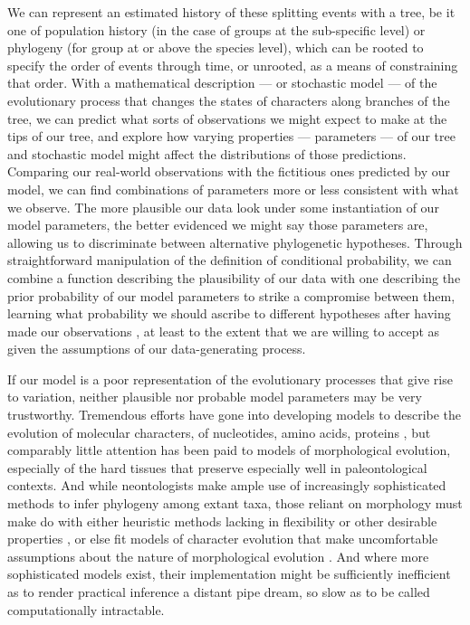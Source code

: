 We can represent an estimated history of these splitting events with a tree, be it one of population history (in the case of groups at the sub-specific level) or phylogeny (for group at or above the species level), which can be rooted to specify the order of events through time, or unrooted, as a means of constraining that order. With a mathematical description --- or stochastic model --- of the evolutionary process that changes the states of characters along branches of the tree, we can predict what sorts of observations we might expect to make at the tips of our tree, and explore how varying properties --- parameters --- of our tree and stochastic model might affect the distributions of those predictions. Comparing our real-world observations with the fictitious ones predicted by our model, we can find combinations of parameters more or less consistent with what we observe. The more plausible our data look under some instantiation of our model parameters, the better evidenced we might say those parameters are, allowing us to discriminate between alternative phylogenetic hypotheses. Through straightforward manipulation of the definition of conditional probability, we can combine a function describing the plausibility of our data with one describing the prior probability of our model parameters to strike a compromise between them, learning what probability we should ascribe to different hypotheses after having made our observations \citep{bayesLIIEssaySolving1763}, at least to the extent that we are willing to accept as given the assumptions of our data-generating process.

If our model is a poor representation of the evolutionary processes that give rise to variation, neither plausible nor probable model parameters may be very trustworthy. Tremendous efforts have gone into developing models to describe the evolution of molecular characters, of nucleotides, amino acids, proteins \citep{hollandRiseStatisticalPhylogenetics2013, kapliPhylogeneticTreeBuilding2020}, but comparably little attention has been paid to models of morphological evolution, especially of the hard tissues that preserve especially well in paleontological contexts. And while neontologists make ample use of increasingly sophisticated methods to infer phylogeny among extant taxa, those reliant on morphology must make do with either heuristic methods lacking in flexibility or other desirable properties \citep[e.g. a principled accounting of inferential uncertainty, consistency at the limit of infinite data, etc.]{wrightBayesianAnalysisUsing2014}, or else fit models of character evolution that make uncomfortable assumptions about the nature of morphological evolution \citep[e.g. independence between characters, monomorphism within lineages, etc.]{felsensteinInferringPhylogenies2004}. And where more sophisticated models exist, their implementation might be sufficiently inefficient as to render practical inference a distant pipe dream, so slow as to be called computationally intractable. 

